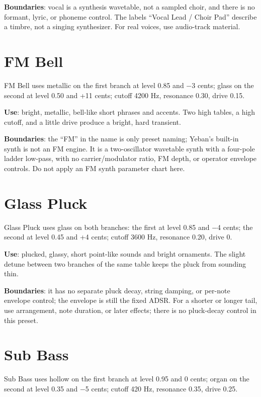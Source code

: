 \textbf{Boundaries}: vocal is a synthesis wavetable, not a sampled choir, and there
is no formant, lyric, or phoneme control. The labels ``Vocal Lead / Choir Pad''
describe a timbre, not a singing synthesizer. For real voices, use audio-track
material.

\section{FM Bell}

FM Bell uses metallic on the first branch at level 0.85 and −3 cents; glass on the
second at level 0.50 and +11 cents; cutoff 4200 Hz, resonance 0.30, drive 0.15.

\textbf{Use}: bright, metallic, bell-like short phrases and accents. Two high
tables, a high cutoff, and a little drive produce a bright, hard transient.

\textbf{Boundaries}: the ``FM'' in the name is only preset naming; Yeban's built-in
synth is not an FM engine. It is a two-oscillator wavetable synth with a four-pole
ladder low-pass, with no carrier/modulator ratio, FM depth, or operator envelope
controls. Do not apply an FM synth parameter chart here.

\section{Glass Pluck}

Glass Pluck uses glass on both branches: the first at level 0.85 and −4 cents; the
second at level 0.45 and +4 cents; cutoff 3600 Hz, resonance 0.20, drive 0.

\textbf{Use}: plucked, glassy, short point-like sounds and bright ornaments. The
slight detune between two branches of the same table keeps the pluck from sounding
thin.

\textbf{Boundaries}: it has no separate pluck decay, string damping, or per-note
envelope control; the envelope is still the fixed ADSR. For a shorter or longer
tail, use arrangement, note duration, or later effects; there is no pluck-decay
control in this preset.

\section{Sub Bass}

Sub Bass uses hollow on the first branch at level 0.95 and 0 cents; organ on the
second at level 0.35 and −5 cents; cutoff 420 Hz, resonance 0.35, drive 0.25.

